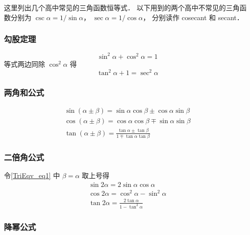 

这里列出几个高中常见的三角函数恒等式． 以下用到的两个高中不常见的三角函数分别为 $\csc \alpha= 1/\sin \alpha$， $\sec \alpha = 1/\cos \alpha$， 分别读作 cosecant 和 secant．

\subsubsection{勾股定理}
\begin{equation}
\sin^2 \alpha + \cos^2 \alpha = 1
\end{equation}
等式两边同除 $\cos^2 \alpha$ 得
\begin{equation}\label{TriEqv_eq13}
\tan^2 \alpha + 1 = \sec^2 \alpha
\end{equation}

\subsubsection{两角和公式}
\begin{gather}\label{TriEqv_eq1}
\sin(\alpha\pm \beta) = \sin \alpha\cos \beta \pm \cos \alpha\sin \beta\\
\label{TriEqv_eq2}
\cos(\alpha\pm \beta) = \cos \alpha\cos \beta \mp \sin \alpha\sin \beta\\
\tan(\alpha\pm \beta) = \frac{\tan \alpha \pm \tan \beta}{1 \mp \tan \alpha \tan \beta}
\end{gather}

\subsubsection{二倍角公式}

令\autoref{TriEqv_eq1} 中 $\beta=\alpha$ 取上号得
\begin{gather}
\sin 2\alpha = 2\sin \alpha\cos \alpha\\
\label{TriEqv_eq4}
\cos 2\alpha = \cos^2 \alpha - \sin^2 \alpha\\
\tan 2\alpha = \frac{2\tan \alpha}{1 - \tan^2 \alpha}
\end{gather}

\subsubsection{降幂公式}

